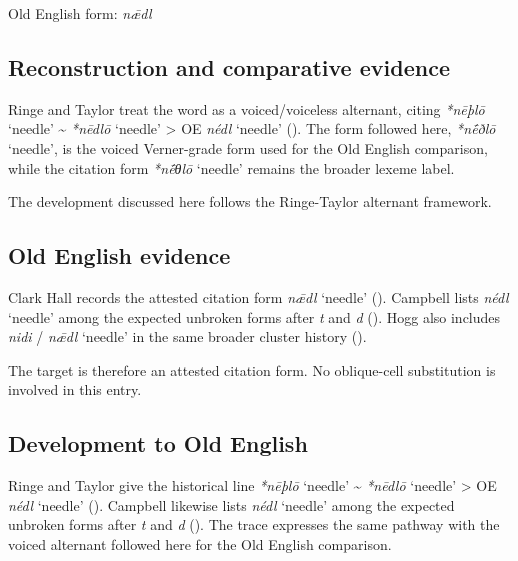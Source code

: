 \documentclass[
  british,
  a4paper,
  openany]{book}
\providecommand{\Recon}[1]{\emph{*#1}}
{\catcode`→=\active \global\def→{\ensuremath{\rightarrow}}}
\providecommand{\Recon}[1]{\emph{*#1}}
{\catcode`→=\active \global\def→{\ensuremath{\rightarrow}}}
\begin{document}
Old English form: \emph{nǣdl}

\subsection{Reconstruction and comparative
evidence}\label{reconstruction-and-comparative-evidence-91}

Ringe and Taylor treat the word as a voiced/voiceless alternant, citing
\Recon{nēþlō} `needle' \textasciitilde{} \Recon{nēdlō} `needle'
\textgreater{} OE \emph{nédl} `needle'
(). The form
followed here, {\Recon{nḗðlō} `needle'}, is the voiced Verner-grade form
used for the Old English comparison, while the citation form
{\Recon{nḗθlō} `needle'} remains the broader lexeme label.

The development discussed here follows the Ringe-Taylor alternant
framework.

\subsection{Old English evidence}\label{old-english-evidence-91}

Clark Hall records the attested citation form \emph{nǣdl} `needle'
(). Campbell lists
\emph{nédl} `needle' among the expected unbroken forms after \emph{t}
and \emph{d} ().
Hogg also includes \emph{nidi} / \emph{nǣdl} `needle' in the same
broader cluster history ().

The target is therefore an attested citation form. No oblique-cell
substitution is involved in this entry.

\subsection{Development to Old
English}\label{development-to-old-english-91}

Ringe and Taylor give the historical line \Recon{nēþlō} `needle'
\textasciitilde{} \Recon{nēdlō} `needle' \textgreater{} OE \emph{nédl}
`needle' ().
Campbell likewise lists \emph{nédl} `needle' among the expected unbroken
forms after \emph{t} and \emph{d} (). The trace expresses the same pathway with the voiced
alternant followed here for the Old English comparison.
\end{document}
